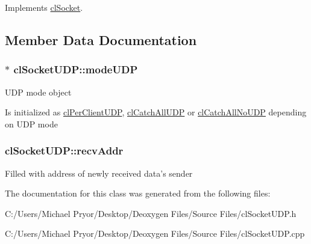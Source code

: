 Implements \hyperlink{classcl_socket}{clSocket}.



\subsection{Member Data Documentation}
\hypertarget{classcl_socket_u_d_p_a6291807aa55d5fe97be5b398d56f4fa7}{
\subsubsection[{modeUDP}]{$\ast$ {\bf clSocketUDP::modeUDP}}}
\label{classcl_socket_u_d_p_a6291807aa55d5fe97be5b398d56f4fa7}
UDP mode object \par
 Is initialized as \hyperlink{classcl_per_client_u_d_p}{clPerClientUDP}, \hyperlink{classcl_catch_all_u_d_p}{clCatchAllUDP} or \hyperlink{classcl_catch_all_no_u_d_p}{clCatchAllNoUDP} depending on UDP mode \hypertarget{classcl_socket_u_d_p_a4011a7b3c5a811ac54e477a95c87a402}{
\subsubsection[{recvAddr}]{ {\bf clSocketUDP::recvAddr}}}
\label{classcl_socket_u_d_p_a4011a7b3c5a811ac54e477a95c87a402}
Filled with address of newly received data's sender 

The documentation for this class was generated from the following files:\begin{DoxyCompactItemize}
\item 
C:/Users/Michael Pryor/Desktop/Deoxygen Files/Source Files/clSocketUDP.h\item 
C:/Users/Michael Pryor/Desktop/Deoxygen Files/Source Files/clSocketUDP.cpp\end{DoxyCompactItemize}
